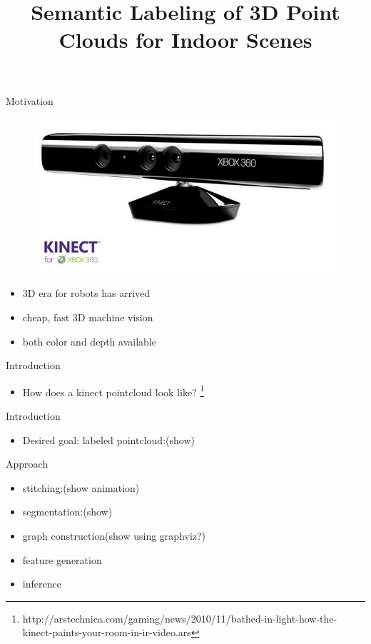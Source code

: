 \documentclass{beamer}
\title{Semantic Labeling of 3D Point Clouds for Indoor Scenes}
\begin{document}
\begin{frame}
\titlepage
\end{frame}

\begin{frame}{Motivation}
	\begin{figure}[t!]
		\includegraphics[width=.5\linewidth]{kinect.jpg}
	\end{figure}

	\begin{itemize}
		\item 3D era for robots has arrived 
		\item  cheap, fast 3D machine vision
		\item  both color and depth available
	\end{itemize}

\end{frame}

\begin{frame}{Introduction}
	\begin{itemize}
		\item How does a kinect pointcloud look like? \footnote{http://arstechnica.com/gaming/news/2010/11/bathed-in-light-how-the-kinect-paints-your-room-in-ir-video.ars}

	\end{itemize}
\end{frame}

\begin{frame}{Introduction}
	\begin{itemize}
		\item Desired goal: labeled pointcloud:(show)

	\end{itemize}
\end{frame}

\begin{frame}{Approach}
	\begin{itemize}
		\item stitching:(show animation)
		\item  segmentation:(show)
		\item  graph construction(show using graphviz?)
		\item  feature generation
		\item  inference
	\end{itemize}

\end{frame}
\end{document}
